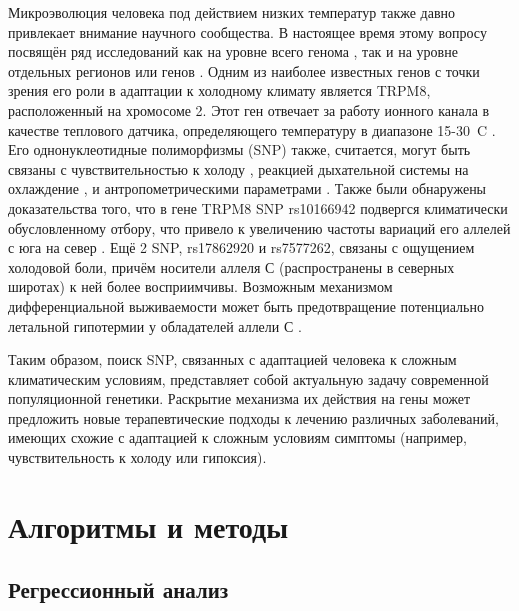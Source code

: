 Микроэволюция человека под действием низких температур также давно привлекает внимание научного сообщества. В настоящее время этому вопросу посвящён ряд исследований как на уровне всего генома \autocite{Hancock2011adaptations, Cardona2014, Valverde2015}, так и на уровне отдельных регионов или генов \autocite{Ohashi2010, Hancock2010population, Sazzini2014, Quagliarello2017}. Одним из наиболее известных генов с точки зрения его роли в адаптации к холодному климату является TRPM8, расположенный на хромосоме 2. Этот ген отвечает за работу ионного канала в качестве теплового датчика, определяющего температуру в диапазоне 15-30~{\textdegree}C \autocite{Fernandez2011}. Его однонуклеотидные полиморфизмы (SNP) также, считается, могут быть связаны с чувствительностью к холоду \autocite{Kozyreva2011}, реакцией дыхательной системы на охлаждение \autocite{Kozyreva2014}, и антропометрическими параметрами \autocite{Potapova2014}. Также были обнаружены доказательства того, что в гене TRPM8 SNP rs10166942 подвергся климатически обусловленному отбору, что привело к увеличению частоты вариаций его аллелей с юга на север \autocite{Key2018}. Ещё 2 SNP, rs17862920 и rs7577262, связаны с ощущением холодовой боли, причём носители аллеля С (распространены в северных широтах) к ней более восприимчивы. Возможным механизмом дифференциальной выживаемости может быть предотвращение потенциально летальной гипотермии у обладателей аллели С \autocite{Igoshin2019}. 

Таким образом, поиск SNP, связанных с адаптацией человека к сложным климатическим условиям, представляет собой актуальную задачу современной популяционной генетики. Раскрытие механизма их действия на гены может предложить новые терапевтические подходы к лечению различных заболеваний, имеющих схожие с адаптацией к сложным условиям симптомы (например, чувствительность к холоду или гипоксия).

\section{Алгоритмы и методы}\label{sec:ch1/sec2}

\subsection{Регрессионный анализ}\label{subsec:ch1/sec2/subsec1}

